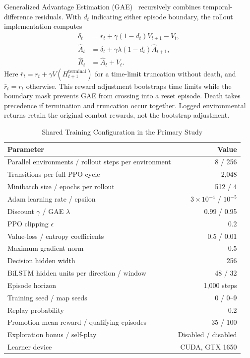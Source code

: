 \documentclass[conference]{IEEEtran}
\begin{document}
Generalized Advantage Estimation (GAE)~\cite{gae} recursively combines temporal-difference residuals. With $d_t$ indicating either episode boundary, the rollout implementation computes
\begin{align}
\delta_t &= \bar r_t+\gamma(1-d_t)V_{t+1}-V_t,\\
\widehat{A}_t &= \delta_t+\gamma\lambda(1-d_t)\widehat{A}_{t+1},\\
\widehat{R}_t &= \widehat{A}_t+V_t.
\end{align}
Here $\bar r_t=r_t+\gamma V(H_{t+1}^{\mathrm{terminal}})$ for a time-limit truncation without death, and $\bar r_t=r_t$ otherwise. This reward adjustment bootstraps time limits while the boundary mask prevents GAE from crossing into a reset episode. Death takes precedence if termination and truncation occur together. Logged environmental returns retain the original combat rewards, not the bootstrap adjustment.

\begin{table}[t]
\caption{Shared Training Configuration in the Primary Study}
\label{tab:hyperparameters}
\centering\footnotesize
\begin{tabularx}{\columnwidth}{@{}Y r@{}}
\toprule Parameter & Value \\
\midrule
Parallel environments / rollout steps per environment & 8 / 256 \\
Transitions per full PPO cycle & 2,048 \\
Minibatch size / epochs per rollout & 512 / 4 \\
Adam learning rate / epsilon & $3\times10^{-4}$ / $10^{-5}$ \\
Discount $\gamma$ / GAE $\lambda$ & 0.99 / 0.95 \\
PPO clipping $\epsilon$ & 0.2 \\
Value-loss / entropy coefficients & 0.5 / 0.01 \\
Maximum gradient norm & 0.5 \\
Decision hidden width & 256 \\
BiLSTM hidden units per direction / window & 48 / 32 \\
Episode horizon & 1,000 steps \\
Training seed / map seeds & 0 / 0--9 \\
Replay probability & 0.2 \\
Promotion mean reward / qualifying episodes & 35 / 100 \\
Exploration bonus / self-play & Disabled / disabled \\
Learner device & CUDA, GTX 1650 \\
\bottomrule
\end{tabularx}
\end{table}
\end{document}
